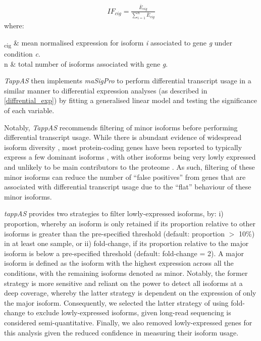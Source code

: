 \begin{myequation}[!h]
	\label{eqn:tappas_IF}
	\begin{align}
		IF_{cig} = \frac{\bar{E}_{cig}}{\sum_{i=1}^{n}\bar{E}_{cig}}
	\end{align}
	where:
	\begin{conditions*}
		\hspace{3mm}\textsubscript{cig} & mean normalised expression for isoform \textit{i} associated to gene \textit{g} under condition \textit{c}.\\
		\hspace{3mm}n  & total number of isoforms associated with gene \textit{g}.
	\end{conditions*}
\end{myequation}


\textit{TappAS} then implements \textit{maSigPro} to perform differential transcript usage in a similar manner to differential  expression analyses (as described in \cref{diffrential_exp}) by fitting a generalised linear model and testing the significance of each variable. 

Notably, \textit{TappAS} recommends filtering of minor isoforms before performing differential transcript usage. While there is abundant evidence of widespread isoform diversity \cite{Wang2008}, most protein-coding genes have been reported to typically express a few dominant isoforms \cite{Gonzalez-Porta2013, Ezkurdia2015}, with other isoforms being very lowly expressed and unlikely to be main contributors to the proteome \cite{Gonzalez-Porta2013}. As such, filtering of these minor isoforms can reduce the number of “false positives” from genes that are associated with differential transcript usage due to the “flat” behaviour of these minor isoforms\cite{DeLaFuente2020}. 

\textit{tappAS} provides two strategies to filter lowly-expressed isoforms, by: i) proportion, whereby an isoform is only retained if its proportion relative to other isoforms is greater than the pre-specified threshold (default: proportion $>$ 10\%) in at least one sample, or ii) fold-change, if its proportion relative to the major isoform is below a pre-specified threshold (default: fold-change = 2). A major isoform is defined as the isoform with the highest expression across all the conditions, with the remaining isoforms denoted as minor. Notably, the former strategy is more sensitive and reliant on the power to detect all isoforms at a deep coverage, whereby the latter strategy is dependent on the expression of only the major isoform. Consequently, we selected the latter strategy of using fold-change to exclude lowly-expressed isoforms, given long-read sequencing is considered semi-quantitative. Finally, we also removed lowly-expressed genes for this analysis given the reduced confidence in measuring their isoform usage. 